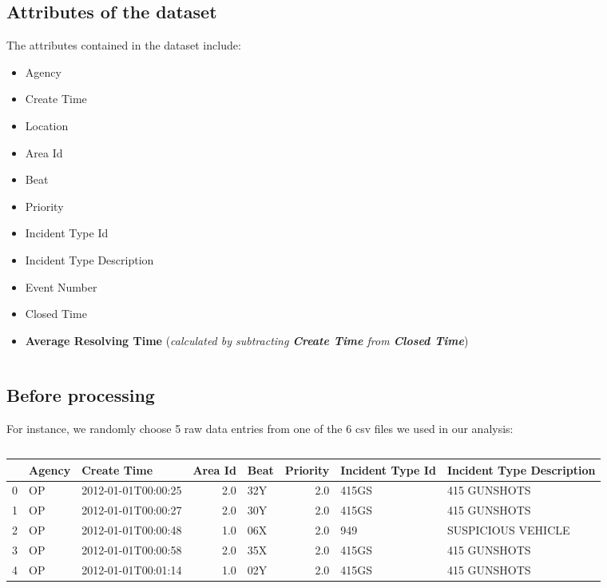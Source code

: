\documentclass{article} %
\begin{document}
\subsection{Attributes of the dataset}
The attributes contained in the dataset include:
\begin{itemize}
\item  Agency
\item  Create Time
\item  Location
\item  Area Id
\item  Beat
\item  Priority
\item  Incident Type Id
\item  Incident Type Description
\item  Event Number
\item  Closed Time
\item  \textbf{Average Resolving Time} (\textit{calculated by subtracting \textbf{Create Time} from \textbf{Closed Time}})

\end{itemize}

\[\]

\subsection{Before processing}

For instance, we randomly choose 5 raw data entries from one of the 6 csv files we used in our analysis:

\[\]

\begin{tabular}{|l|l|l|r|l|r|l|l|}
	\toprule
	{} & Agency &          Create Time &  Area Id & Beat &  Priority & Incident Type Id & Incident Type Description \\
	\midrule
	0 &     OP &  2012-01-01T00:00:25 &      2.0 &  32Y &       2.0 &            415GS &              415 GUNSHOTS \\
	1 &     OP &  2012-01-01T00:00:27 &      2.0 &  30Y &       2.0 &            415GS &              415 GUNSHOTS \\
	2 &     OP &  2012-01-01T00:00:48 &      1.0 &  06X &       2.0 &              949 &        SUSPICIOUS VEHICLE \\
	3 &     OP &  2012-01-01T00:00:58 &      2.0 &  35X &       2.0 &            415GS &              415 GUNSHOTS \\
	4 &     OP &  2012-01-01T00:01:14 &      1.0 &  02Y &       2.0 &            415GS &              415 GUNSHOTS \\
	\bottomrule
\end{tabular}
\end{document}
